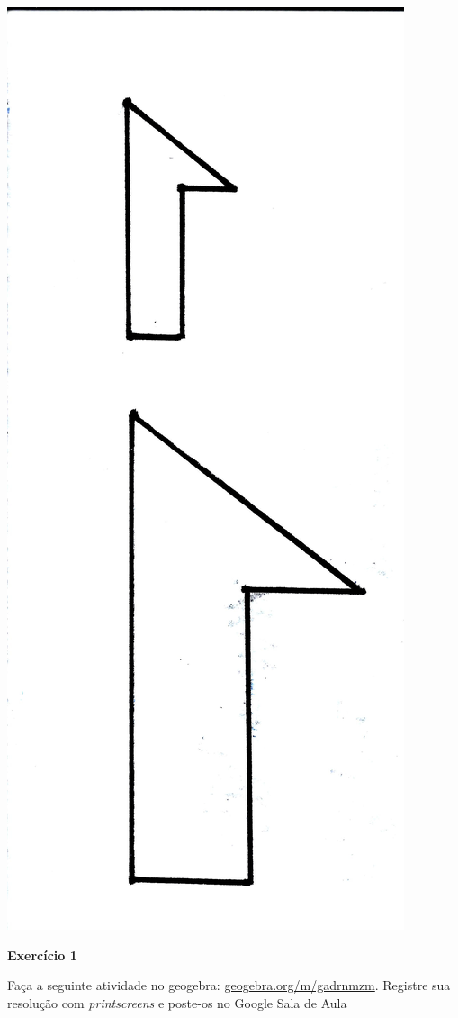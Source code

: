\documentclass[twoside, 12pt]{article}
\begin{document}
\begin{center}
  \includegraphics[height=0.2\textheight]{img/03-4}
\end{center}

\begin{center}
\end{center}

\bf{Exercício 1}

Faça a seguinte atividade no geogebra: \url{geogebra.org/m/gadrnmzm}.
Registre sua resolução com \emph{printscreens} e poste-os no Google Sala
de Aula
\end{document}
